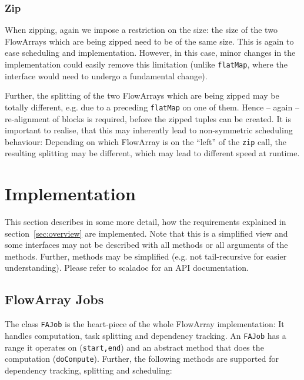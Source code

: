 \documentclass[runningheads,a4paper,fleqn]{llncs}
\begin{document}
\subsubsection{Zip}
When zipping, again we impose a restriction on the size: the size of
the two FlowArrays which are being zipped need to be of the same
size. This is again to ease scheduling and implementation. However, in
this case, minor changes in the implementation could easily remove
this limitation (unlike \texttt{flatMap}, where the interface would
need to undergo a fundamental change).

Further, the splitting of the two FlowArrays which are being zipped
may be totally different, e.g. due to a preceding \texttt{flatMap} on
one of them. Hence -- again -- re-alignment of blocks is required,
before the zipped tuples can be created. It is important to realise,
that this may inherently lead to non-symmetric scheduling behaviour:
Depending on which FlowArray is on the ``left'' of the \texttt{zip}
call, the resulting splitting may be different, which may lead to
different speed at runtime. 

\section{Implementation}
\label{sec:implementation}

This section describes in some more detail, how the requirements
explained in section~\ref{sec:overview} are implemented. Note that
this is a simplified view and some interfaces may not be described
with all methods or all arguments of the methods. Further, methods may
be simplified (e.g. not tail-recursive for easier
understanding). Please refer to scaladoc for an API documentation.

\subsection{FlowArray Jobs}
The class \texttt{FAJob} is the heart-piece of the whole FlowArray
implementation: It handles computation, task splitting and dependency
tracking. An \texttt{FAJob} has a range it operates on
(\texttt{start,end}) and an abstract method that does the computation
(\texttt{doCompute}). Further, the following methods are supported for
dependency tracking, splitting and scheduling:
\end{document}
